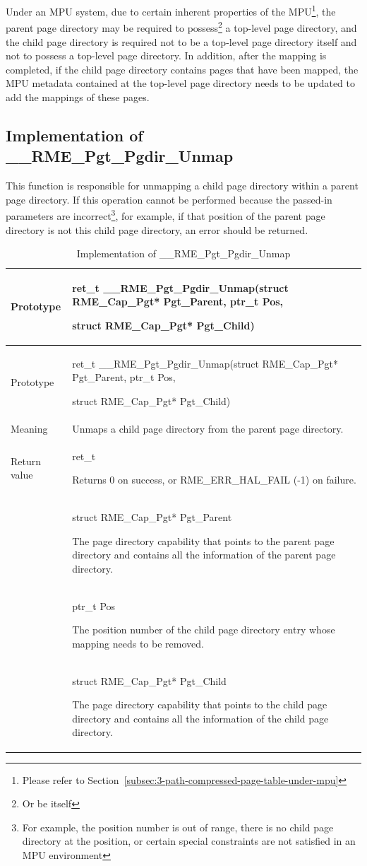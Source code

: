 Under an MPU system, due to certain inherent properties of the MPU\footnote{Please refer to Section~\ref{subsec:3-path-compressed-page-table-under-mpu}}, the parent page directory may be required to possess\footnote{Or be itself} a top-level page directory, and the child page directory is required not to be a top-level page directory itself and not to possess a top-level page directory. In addition, after the mapping is completed, if the child page directory contains pages that have been mapped, the MPU metadata contained at the top-level page directory needs to be updated to add the mappings of these pages.

\subsection{Implementation of \_\_RME\_Pgt\_Pgdir\_Unmap}\label{subsec:7-rme-pgt-pgdir-unmap-implementation}

This function is responsible for unmapping a child page directory within a parent page directory. If this operation cannot be performed because the passed-in parameters are incorrect\footnote{For example, the position number is out of range, there is no child page directory at the position, or certain special constraints are not satisfied in an MPU environment}, for example, if that position of the parent page directory is not this child page directory, an error should be returned.

\begin{xltabular}{\textwidth}{@{}>{\hsize\raggedright\arraybackslash}X>{\hsize\raggedright\arraybackslash}X@{}}
\caption{Implementation of \_\_RME\_Pgt\_Pgdir\_Unmap}\label{tab:7-82-rme-pgt-pgdir-unmap-implementation}\\
\toprule
Prototype\strut
 & ret\_t \_\_RME\_Pgt\_Pgdir\_Unmap(struct RME\_Cap\_Pgt* Pgt\_Parent,
ptr\_t Pos,

struct RME\_Cap\_Pgt* Pgt\_Child)\strut
\tabularnewline
\endfirsthead
\toprule
Prototype\strut
 & ret\_t \_\_RME\_Pgt\_Pgdir\_Unmap(struct RME\_Cap\_Pgt* Pgt\_Parent,
ptr\_t Pos,

struct RME\_Cap\_Pgt* Pgt\_Child)\strut
\tabularnewline
\midrule
\endhead
\bottomrule
\endlastfoot
Meaning & Unmaps a child page directory from the parent page directory.\tabularnewline
Return value\strut
 & ret\_t

Returns 0 on success, or RME\_ERR\_HAL\_FAIL (-1) on failure.\strut
\tabularnewline
{} & struct RME\_Cap\_Pgt* Pgt\_Parent

The page directory capability that points to the parent page directory and contains all the information of the parent page directory.\strut
\tabularnewline
\strut
 & ptr\_t Pos

The position number of the child page directory entry whose mapping needs to be removed.\strut
\tabularnewline
\strut
 & struct RME\_Cap\_Pgt* Pgt\_Child

The page directory capability that points to the child page directory and contains all the information of the child page directory.\strut
\tabularnewline
\end{xltabular}
\nopagebreak[4]


